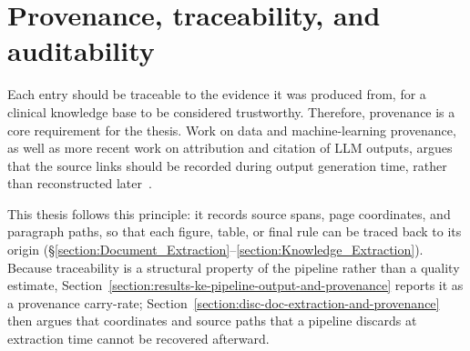 \section{Provenance, traceability, and auditability}\label{section:background-provenance-traceability-and-auditability}

Each entry should be traceable to the evidence it was produced from, for a clinical knowledge base to be considered trustworthy. Therefore, provenance is a core requirement for the thesis. Work on data and machine-learning provenance, as well as more recent work on attribution and citation of LLM outputs, argues that the source links should be recorded during output generation time, rather than reconstructed later~\parencite{simmhan2005surveydataprovenance}. 

This thesis follows this principle: it records source spans, page coordinates, and paragraph paths, so that each figure, table, or final rule can be traced back to its origin (§\ref{section:Document_Extraction}--\ref{section:Knowledge_Extraction}). Because traceability is a structural property of the pipeline rather than a quality estimate, Section~\ref{section:results-ke-pipeline-output-and-provenance} reports it as a provenance carry-rate; Section~\ref{section:disc-doc-extraction-and-provenance} then argues that coordinates and source paths that a pipeline discards at extraction time cannot be recovered afterward.